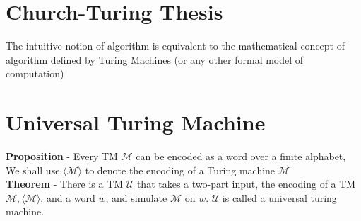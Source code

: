 \documentclass{article}[18pt]
\begin{document}
\section{Church-Turing Thesis}
The intuitive notion of algorithm is equivalent to the mathematical concept of algorithm defined by Turing Machines (or any other formal model of computation)
\section{Universal Turing Machine}
\textbf{Proposition} - Every TM $\mathscr{M}$ can be encoded as a word over a finite alphabet, We shall use $\langle\mathscr{M}\rangle$ to denote the encoding of a Turing machine $\mathscr{M}$\\
\textbf{Theorem} - There is a TM $\mathscr{U}$ that takes a two-part input, the encoding of a TM $\mathscr{M},\langle\mathscr{M}\rangle$, and a word $w$, and simulate $\mathscr{M}$ on $w$. $\mathscr{U}$ is called a universal turing machine.
\end{document}

